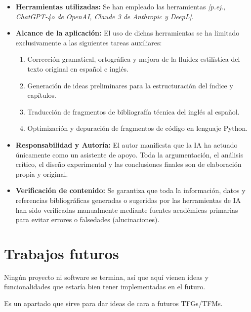 \documentclass[a4paper, 12pt]{book}
\begin{document}
\begin{itemize}
    \item \textbf{Herramientas utilizadas:} Se han empleado las herramientas \textit{[p.ej., ChatGPT-4o de OpenAI, Claude 3 de Anthropic y DeepL]}.
    
    \item \textbf{Alcance de la aplicación:} El uso de dichas herramientas se ha limitado exclusivamente a las siguientes tareas auxiliares:

    \begin{enumerate}
        \item Corrección gramatical, ortográfica y mejora de la fluidez estilística del texto original en español e inglés.
        \item Generación de ideas preliminares para la estructuración del índice y capítulos.
        \item Traducción de fragmentos de bibliografía técnica del inglés al español.
        \item Optimización y depuración de fragmentos de código en lenguaje Python.
    \end{enumerate}

    \item \textbf{Responsabilidad y Autoría:} El autor manifiesta que la IA ha actuado únicamente como un asistente de apoyo. Toda la argumentación, el análisis crítico, el diseño experimental y las conclusiones finales son de elaboración propia y original. 
    
    \item \textbf{Verificación de contenido:} Se garantiza que toda la información, datos y referencias bibliográficas generadas o sugeridas por las herramientas de IA han sido verificadas manualmente mediante fuentes académicas primarias para evitar errores o falsedades (alucinaciones).
\end{itemize}


\section{Trabajos futuros}
\label{sec:trabajos_futuros}

Ningún proyecto ni software se termina, así que aquí vienen ideas y funcionalidades que estaría bien tener implementadas en el futuro.

Es un apartado que sirve para dar ideas de cara a futuros TFGs/TFMs.


\end{document}
